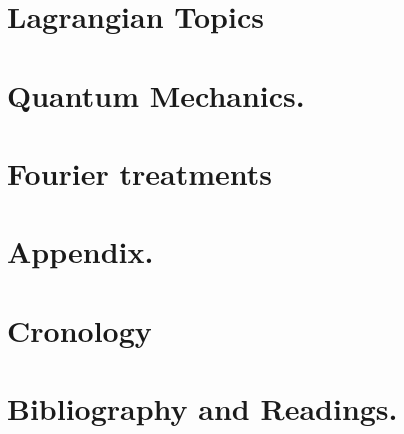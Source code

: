 \documentclass[12pt,leqno]{book}
\begin{document}
\part{Lagrangian Topics}






\part{Quantum Mechanics.}








\part{Fourier treatments}









\part{Appendix.}





\part{Cronology}

\part{Bibliography and Readings.}


\end{document}
